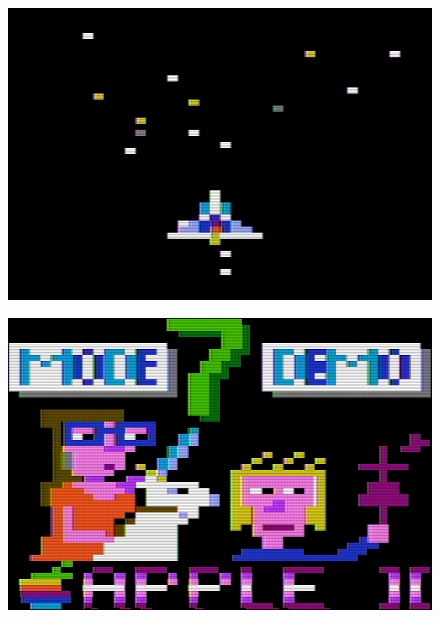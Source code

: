 \documentclass[twocolumn]{article}
\begin{document}
\begin{figure}
\includegraphics[width=\columnwidth]{figures/m7_screen3.jpg}
\end{figure}

\begin{figure}
\includegraphics[width=\columnwidth]{figures/mode7_demo_title.png}
\end{figure}
\end{document}

